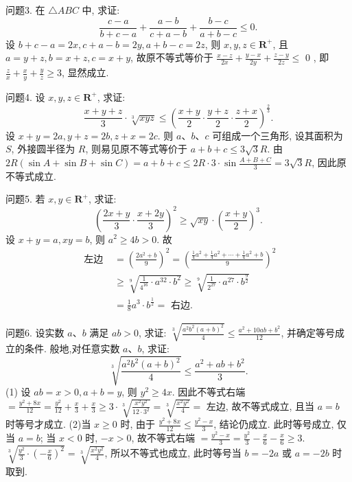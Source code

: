 问题3. 在 $\triangle A B C$ 中, 求证:
$$
\frac{c-a}{b+c-a}+\frac{a-b}{c+a-b}+\frac{b-c}{a+b-c} \leqslant 0 .
$$
设 $b+c-a=2 x, c+a-b=2 y, a+b-c=2 z$, 则 $x, y, z \in \mathbf{R}^{+}$, 且 $a=y+z, b=x+z, c=x+y$, 故原不等式等价于 $\frac{x-z}{2 x}+\frac{y-x}{2 y}+\frac{z-y}{2 z} \leqslant$ 0 , 即 $\frac{z}{x}+\frac{x}{y}+\frac{y}{z} \geqslant 3$, 显然成立.



问题4. 设 $x, y, z \in \mathbf{R}^{+}$, 求证:
$$
\frac{x+y+z}{3} \cdot \sqrt[3]{x y z} \leqslant\left(\frac{x+y}{2} \cdot \frac{y+z}{2} \cdot \frac{z+x}{2}\right)^{\frac{2}{3}} .
$$
设 $x+y=2 a, y+z=2 b, z+x=2 c$. 则 $a 、 b 、 c$ 可组成一个三角形, 设其面积为 $S$, 外接圆半径为 $R$, 则易见原不等式等价于 $a+b+c \leqslant 3 \sqrt{3} R$.
由 $2 R(\sin A+\sin B+\sin C)=a+b+c \leqslant 2 R \cdot 3 \cdot \sin \frac{A+B+C}{3}=3 \sqrt{3} R$, 因此原不等式成立.



问题5. 若 $x, y \in \mathbf{R}^{+}$, 求证:
$$
\left(\frac{2 x+y}{3} \cdot \frac{x+2 y}{3}\right)^2 \geqslant \sqrt{x y} \cdot\left(\frac{x+y}{2}\right)^3 .
$$
设 $x+y=a, x y=b$, 则 $a^2 \geqslant 4 b>0$. 故
$$
\begin{aligned}
\text { 左边 } & =\left(\frac{2 a^2+b}{9}\right)^2=\left(\frac{\frac{1}{4} a^2+\frac{1}{4} a^2+\cdots+\frac{1}{4} a^2+b}{9}\right)^2 \\
& \geqslant \sqrt[9]{\frac{1}{4^{16}} \cdot a^{32} \cdot b^2} \geqslant \sqrt[9]{\frac{1}{2^{27}} \cdot a^{27} \cdot b^{\frac{9}{2}}} \\
& =\frac{1}{8} a^3 \cdot b^{\frac{1}{2}}=\text { 右边.
}
\end{aligned}
$$



问题6. 设实数 $a 、 b$ 满足 $a b>0$, 求证: $\sqrt[3]{\frac{a^2 b^2(a+b)^2}{4}} \leqslant \frac{a^2+10 a b+b^2}{12}$, 并确定等号成立的条件.
般地,对任意实数 $a 、 b$, 求证:
$$
\sqrt[3]{\frac{a^2 b^2(a+b)^2}{4}} \leqslant \frac{a^2+a b+b^2}{3} .
$$
(1) 设 $a b=x>0, a+b=y$, 则 $y^2 \geqslant 4 x$. 因此不等式右端 $=\frac{y^2+8 x}{12}= \frac{y^2}{12}+\frac{x}{3}+\frac{x}{3} \geqslant 3 \cdot \sqrt[3]{\frac{x^2 y^2}{12 \cdot 3^2}}=\sqrt[3]{\frac{x^2 y^2}{4}}=$ 左边, 故不等式成立, 且当 $a=b$ 时等号才成立.
(2)当 $x \geqslant 0$ 时, 由于 $\frac{y^2+8 x}{12} \leqslant \frac{y^2-x}{3}$, 结论仍成立.
此时等号成立, 仅当 $a=b$;
当 $x<0$ 时, $-x>0$, 故不等式右端 $=\frac{y^2-x}{3}=\frac{y^2}{3}-\frac{x}{6}-\frac{x}{6} \geqslant 3$. $\sqrt[3]{\frac{y^2}{3} \cdot\left(-\frac{x}{6}\right)^2}=\sqrt[3]{\frac{x^2 y^2}{4}}$, 所以不等式也成立, 此时等号当 $b=-2 a$ 或 $a= -2 b$ 时取到.



